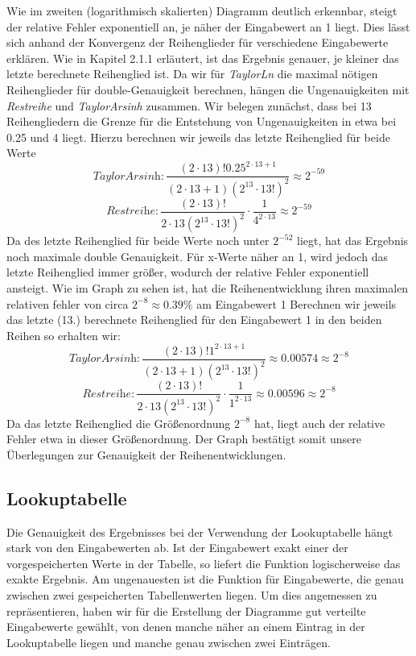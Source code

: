 \documentclass[course=erap] {aspdoc}
\begin{document}
    Wie im zweiten (logarithmisch skalierten) Diagramm deutlich erkennbar, steigt der relative Fehler exponentiell an, je näher der Eingabewert an 1 liegt. Dies lässt sich  anhand der Konvergenz der Reihenglieder für verschiedene Eingabewerte erklären. Wie in Kapitel 2.1.1 erläutert, ist das Ergebnis genauer, je kleiner das letzte berechnete Reihenglied ist. Da wir für \textit{TaylorLn} die maximal nötigen Reihenglieder für double-Genauigkeit berechnen, hängen die Ungenauigkeiten mit \textit{Restreihe} und \textit{TaylorArsinh} zusammen. 
    Wir belegen zunächst, dass bei 13 Reihengliedern die Grenze für die Entstehung von Ungenauigkeiten in etwa bei 0.25 und 4 liegt. Hierzu berechnen wir jeweils das letzte Reihenglied für beide Werte 
    \[
    \textit{TaylorArsinh}: \frac{(2\cdot13)!0.25^{2\cdot13 + 1}}{(2\cdot13 + 1)(2^13\cdot13!)^2} \approx 2^{-59}
    \]
    \[
    \textit{Restreihe}: \frac{(2\cdot13)!}{2\cdot13(2^{13}\cdot 13!)^2} \cdot \frac{1}{4^{2\cdot13}} \approx 2^{-59}
    \]
    Da des letzte Reihenglied für beide Werte noch unter $2^{-52}$ liegt, hat das Ergebnis noch maximale double Genauigkeit. Für x-Werte näher an 1, wird jedoch das letzte Reihenglied immer größer, wodurch der relative Fehler exponentiell ansteigt. Wie im Graph zu sehen ist, hat die Reihenentwicklung ihren maximalen relativen fehler von circa $2^{-8} \approx 0.39\%$ am Eingabewert 1
    Berechnen wir jeweils das letzte (13.) berechnete Reihenglied für den Eingabewert 1 in den beiden Reihen so erhalten wir:
    \[
    \textit{TaylorArsinh}: \frac{(2\cdot13)!1^{2\cdot13 + 1}}{(2\cdot13 + 1)(2^13\cdot13!)^2} \approx 0.00574 \approx 2^{-8}
    \]
    \[
    \textit{Restreihe}: \frac{(2\cdot13)!}{2\cdot13(2^{13}\cdot 13!)^2} \cdot \frac{1}{1^{2\cdot13}} \approx 0.00596 \approx 2^{-8}
    \]
    Da das letzte Reihenglied die Größenordnung $2^{-8}$ hat, liegt auch der relative Fehler etwa in dieser Größenordnung. Der Graph bestätigt somit unsere Überlegungen zur Genauigkeit der Reihenentwicklungen. 
    
    
    \subsection{Lookuptabelle}
    Die Genauigkeit des Ergebnisses bei der Verwendung der Lookuptabelle hängt stark von den Eingabewerten ab. Ist der Eingabewert exakt einer der vorgespeicherten Werte in der Tabelle, so liefert die Funktion logischerweise das exakte Ergebnis. Am ungenauesten ist die Funktion für Eingabewerte, die genau zwischen zwei gespeicherten Tabellenwerten liegen. Um dies angemessen zu repräsentieren, haben wir für die Erstellung der Diagramme gut verteilte Eingabewerte gewählt, von denen manche näher an einem Eintrag in der Lookuptabelle liegen und manche genau zwischen zwei Einträgen.  
    
\end{document}
